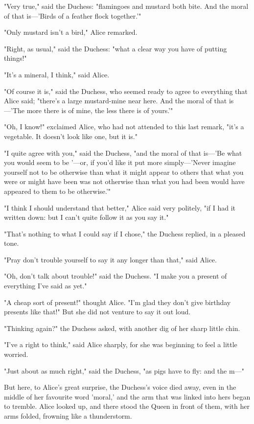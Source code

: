 "Very true," said the Duchess: "flamingoes and mustard both bite. And the moral of that is—'Birds of a feather flock together.'"

"Only mustard isn't a bird," Alice remarked.

"Right, as usual," said the Duchess: "what a clear way you have of putting things!"

"It's a mineral, I think," said Alice.

​"Of course it is," said the Duchess, who seemed ready to agree to everything that Alice said; "there's a large mustard-mine near here. And the moral of that is—'The more there is of mine, the less there is of yours.'"

"Oh, I know!" exclaimed Alice, who had not attended to this last remark, "it's a vegetable. It doesn't look like one, but it is."

"I quite agree with you," said the Duchess, "and the moral of that is—'Be what you would seem to be '—or, if you'd like it put more simply—'Never imagine yourself not to be otherwise than what it might appear to others that what you were or might have been was not otherwise than what you had been would have appeared to them to be otherwise.'"

"I think I should understand that better," Alice said very politely, "if I had it written down: but I can't quite follow it as you say it."

"That's nothing to what I could say if I chose," the Duchess replied, in a pleased tone.

​"Pray don't trouble yourself to say it any longer than that," said Alice.

"Oh, don't talk about trouble!" said the Duchess. "I make you a present of everything I've said as yet."

"A cheap sort of present!" thought Alice. "I'm glad they don't give birthday presents like that!" But she did not venture to say it out loud.

"Thinking again?" the Duchess asked, with another dig of her sharp little chin.

"I've a right to think," said Alice sharply, for she was beginning to feel a little worried.

"Just about as much right," said the Duchess, "as pigs have to fly: and the m—"

But here, to Alice's great surprise, the Duchess's voice died away, even in the middle of her favourite word 'moral,' and the arm that was linked into hers began to tremble. Alice looked up, and there stood the Queen in front of them, with her arms folded, frowning like a thunderstorm.

